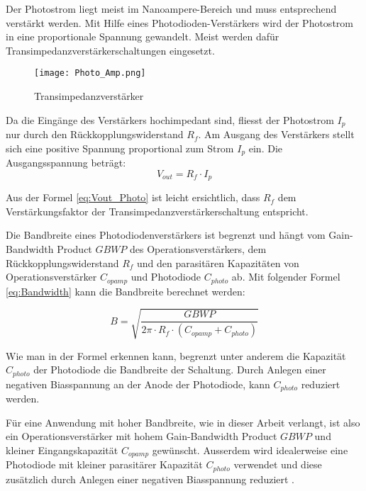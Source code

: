 Der Photostrom liegt meist im Nanoampere-Bereich und muss entsprechend verstärkt werden. Mit Hilfe eines Photodioden-Verstärkers wird der Photostrom in eine proportionale Spannung gewandelt. Meist werden dafür Transimpedanzverstärkerschaltungen eingesetzt.
\begin{figure}[h]
	\centering
	\texttt{[image: Photo\_Amp.png]}
	\caption{Transimpedanzverstärker \cite{PhotoAmp}}\label{fig:Photo_Amp}
\end{figure}

Da die Eingänge des Verstärkers hochimpedant sind, fliesst der Photostrom $ I_{p} $ nur durch den Rückkopplungswiderstand $ R_{f} $. Am Ausgang des Verstärkers stellt sich eine positive Spannung proportional zum Strom $ I_{p} $ ein. Die Ausgangsspannung beträgt:
\begin{equation}\label{eq:Vout_Photo}
V_{out}=R_{f} \cdot I_{p}
\end{equation}

Aus der Formel \ref{eq:Vout_Photo} ist leicht ersichtlich, dass $ R_{f} $ dem Verstärkungsfaktor der Transimpedanzverstärkerschaltung entspricht.

Die Bandbreite eines Photodiodenverstärkers ist begrenzt und hängt vom Gain-Bandwidth Product $GBWP$ des Operationsverstärkers, dem Rückkopplungswiderstand $ R_{f} $ und den parasitären Kapazitäten von Operationsverstärker $ C_{opamp} $ und Photodiode $ C_{photo} $ ab. Mit folgender Formel \ref{eq:Bandwidth} kann die Bandbreite berechnet werden:

\begin{equation}\label{eq:Bandwidth}
B=\sqrt{\frac{GBWP}{2\pi\cdot R_{f}\cdot (C_{opamp}+C_{photo})}}
\end{equation}

Wie man in der Formel erkennen kann, begrenzt unter anderem die Kapazität $ C_{photo} $ der Photodiode die Bandbreite der Schaltung. Durch Anlegen einer negativen Biasspannung an der Anode der Photodiode, kann $ C_{photo} $ reduziert werden.

Für eine Anwendung mit hoher Bandbreite, wie in dieser Arbeit verlangt, ist also ein Operationsverstärker mit hohem Gain-Bandwidth Product $GBWP$ und kleiner Eingangskapazität $ C_{opamp} $ gewünscht. Ausserdem wird idealerweise eine Photodiode mit kleiner parasitärer Kapazität $ C_{photo} $ verwendet und diese zusätzlich durch Anlegen einer negativen Biasspannung reduziert \cite{schleuniger} \cite{design_photo}.
